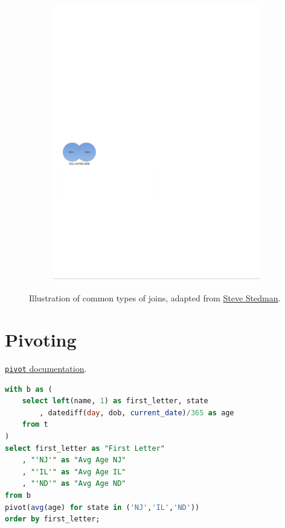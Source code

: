 \begin{figure}[H]
\begin{subfigure}[c]{0.3\textwidth}
  \includegraphics[width=\textwidth]{figures/sql/full_outer_join.pdf}
  \label{fig:sql:joins:full_outer_join}
  \end{subfigure}
\caption{
Illustration of common types of joins, adapted from \href{http://stevestedman.com/2015/03/sql-server-join-types-poster-version-2}{Steve Stedman}.
}
\label{fig:sql:joins}
\end{figure}

\section{Pivoting}
\label{ssql:pivoting}

\noindent \href{https://docs.snowflake.com/en/sql-reference/constructs/pivot.html}{\texttt{pivot} documentation}.

\begin{lstlisting}[language=SQL]
with b as (
	select left(name, 1) as first_letter, state
		, datediff(day, dob, current_date)/365 as age
	from t
)
select first_letter as "First Letter"
	, "'NJ'" as "Avg Age NJ"
	, "'IL'" as "Avg Age IL"
	, "'ND'" as "Avg Age ND"
from b
pivot(avg(age) for state in ('NJ','IL','ND'))
order by first_letter;
\end{lstlisting}

